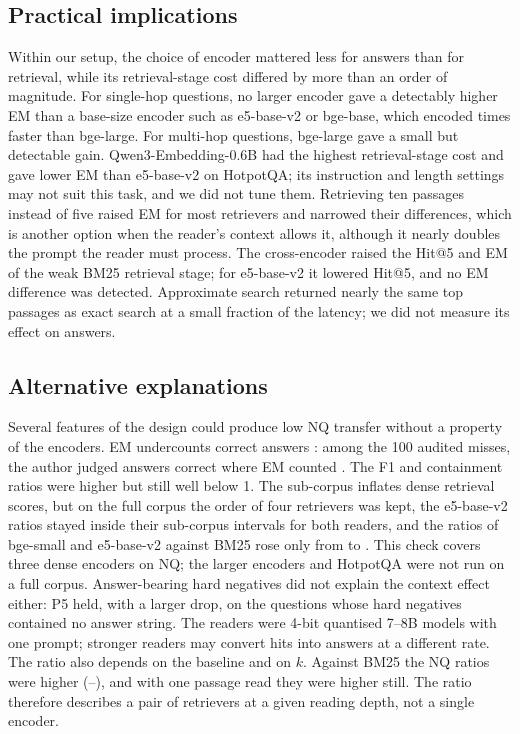 \subsection{Practical implications}
Within our setup, the choice of encoder mattered less for answers than for retrieval, while its retrieval-stage cost differed by more than an order of magnitude. For single-hop questions, no larger encoder gave a detectably higher EM than a base-size encoder such as e5-base-v2 or bge-base, which encoded  times faster than bge-large. For multi-hop questions, bge-large gave a small but detectable gain. Qwen3-Embedding-0.6B had the highest retrieval-stage cost and gave lower EM than e5-base-v2 on HotpotQA; its instruction and length settings may not suit this task, and we did not tune them. Retrieving ten passages instead of five raised EM for most retrievers and narrowed their differences, which is another option when the reader's context allows it, although it nearly doubles the prompt the reader must process. The cross-encoder raised the Hit@5 and EM of the weak BM25 retrieval stage; for e5-base-v2 it lowered Hit@5, and no EM difference was detected. Approximate search returned nearly the same top passages as exact search at a small fraction of the latency; we did not measure its effect on answers.

\subsection{Alternative explanations}
Several features of the design could produce low NQ transfer without a property of the encoders. EM undercounts correct answers \citep{kamalloo2023}: among the 100 audited misses, the author judged  answers correct where EM counted . The F1 and containment ratios were higher but still well below 1. The sub-corpus inflates dense retrieval scores, but on the full corpus the order of four retrievers was kept, the e5-base-v2 ratios stayed inside their sub-corpus intervals for both readers, and the ratios of bge-small and e5-base-v2 against BM25 rose only from  to . This check covers three dense encoders on NQ; the larger encoders and HotpotQA were not run on a full corpus. Answer-bearing hard negatives did not explain the context effect either: P5 held, with a larger drop, on the questions whose hard negatives contained no answer string. The readers were 4-bit quantised 7--8B models with one prompt; stronger readers may convert hits into answers at a different rate. The ratio also depends on the baseline and on $k$. Against BM25 the NQ ratios were higher (--), and with one passage read they were higher still. The ratio therefore describes a pair of retrievers at a given reading depth, not a single encoder.

